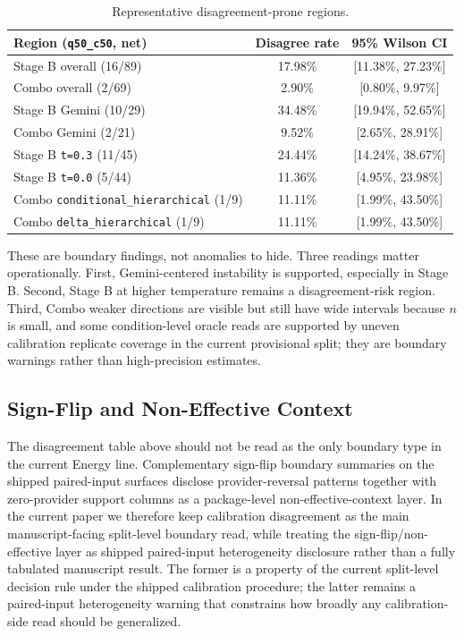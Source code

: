 \documentclass[11pt,a4paper]{article}
\begin{document}
\begin{table}[ht]
\centering
\small
\begin{tabularx}{\textwidth}{@{}Xcc@{}}
\toprule
Region (\texttt{q50\_c50}, net) & Disagree rate & 95\% Wilson CI \\
\midrule
Stage B overall (16/89) & 17.98\% & [11.38\%, 27.23\%] \\
Combo overall (2/69) & 2.90\% & [0.80\%, 9.97\%] \\
Stage B Gemini (10/29) & 34.48\% & [19.94\%, 52.65\%] \\
Combo Gemini (2/21) & 9.52\% & [2.65\%, 28.91\%] \\
Stage B \texttt{t=0.3} (11/45) & 24.44\% & [14.24\%, 38.67\%] \\
Stage B \texttt{t=0.0} (5/44) & 11.36\% & [4.95\%, 23.98\%] \\
Combo \texttt{conditional\_hierarchical} (1/9) & 11.11\% & [1.99\%, 43.50\%] \\
Combo \texttt{delta\_hierarchical} (1/9) & 11.11\% & [1.99\%, 43.50\%] \\
\bottomrule
\end{tabularx}
\caption{Representative disagreement-prone regions.}
\label{tab:boundary_regions}
\end{table}

These are boundary findings, not anomalies to hide. Three readings matter operationally. First, Gemini-centered instability is supported, especially in Stage B. Second, Stage B at higher temperature remains a disagreement-risk region. Third, Combo weaker directions are visible but still have wide intervals because $n$ is small, and some condition-level oracle reads are supported by uneven calibration replicate coverage in the current provisional split; they are boundary warnings rather than high-precision estimates.

\subsection{Sign-Flip and Non-Effective Context}
\label{sec:signflipcontext}

The disagreement table above should not be read as the only boundary type in the current Energy line. Complementary sign-flip boundary summaries on the shipped paired-input surfaces disclose provider-reversal patterns together with zero-provider support columns as a package-level non-effective-context layer. In the current paper we therefore keep calibration disagreement as the main manuscript-facing split-level boundary read, while treating the sign-flip/non-effective layer as shipped paired-input heterogeneity disclosure rather than a fully tabulated manuscript result. The former is a property of the current split-level decision rule under the shipped calibration procedure; the latter remains a paired-input heterogeneity warning that constrains how broadly any calibration-side read should be generalized.
\end{document}
